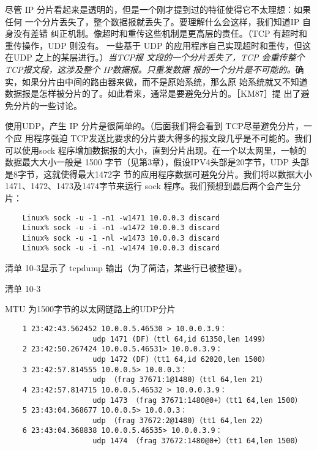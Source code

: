 尽管 IP 分片看起来是透明的，但是一个刚才提到过的特征使得它不太理想：如果任何
一个分片丢失了，整个数据报就丢失了。要理解什么会这样，我们知道IP 自身没有差错
纠正机制。像超时和重传这些机制是更高层的责任。（TCP 有超时和重传操作，UDP 则没有。
一些基于 UDP 的应用程序自己实现超时和重传，但这在UDP 之上的某层进行。）\emph{当TCP报
文段的一个分片丢失了，TCP 会重传整个 TCP报文段，这涉及整个 IP数据报。只重发数据
报的一个分片是不可能的。}确实，如果分片由中间的路由器来做，而不是原始系统，那么原
始系统就又不知道数据报是怎样被分片的了。如此看来，通常是要避免分片的。［KM87］提
出了避免分片的一些讨论。

使用UDP，产生 IP 分片是很简单的。（后面我们将会看到 TCP尽量避免分片，一个应
用程序强迫 TCP发送比要求的分片要大得多的报文段几乎是不可能的。我们可以使用sock
程序增加数据报的大小，直到分片出现。在一个以太网里，一帧的数据最大大小一般是 1500
字节（见第3章），假设IPV4头部是20字节，UDP 头部是8字节\footnotemark，这就使得最大1472字
节的应用程序数据可避免分片。我们将以数据大小 1471、1472、1473及1474字节来运行
sock 程序。我们预想到最后两个会产生分片：

\begin{verbatim}
    Linux% sock -u -1 -n1 -w1471 10.0.0.3 discard
    Linux% sock -u -i -n1 -w1472 10.0.0.3 discard
    Linux% sock -u -1 -nl -w1473 10.0.0.3 discard
    Linux% sock -u -i -n1 -w1474 10.0.0.3 discard
\end{verbatim}

清单 10-3显示了 tcpdump 输出（为了简洁，某些行已被整理）。

清单 10-3

MTU 为1500字节的以太网链路上的UDP分片

\begin{verbatim}
    1 23:42:43.562452 10.0.0.5.46530 > 10.0.0.3.9：
                    udp 1471 (DF)（ttl 64,id 61350,len 1499）
    2 23:42:50.267424 10.0.0.5.46531> 10.0.0.3.9：
                    udp 1472 (DF)（tt1 64,id 62020,len 1500）
    3 23:42:57.814555 10.0.0.5> 10.0.0.3：
                    udp （frag 37671:1@1480）（ttl 64,len 21）
    4 23:42:57.814715 10.0.0.5.46532 > 10.0.0.3.9：
                    udp 1473 （frag 37671:1480@0+）（tt1 64,len 1500）
    5 23:43:04.368677 10.0.0.5> 10.0.0.3：
                    udp （frag 37672:2@1480）（tt1 64,len 22）
    6 23:43:04.368838 10.0.0.5.46535> 10.0.0.3.9：
                    udp 1474 （frag 37672:1480@0+）（tt1 64,len 1500）
\end{verbatim}


